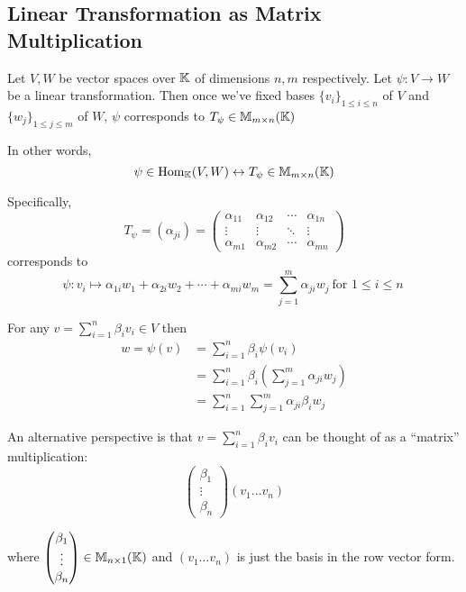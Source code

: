 \subsection{Linear Transformation as Matrix Multiplication}
\begin{claim}
    Let \(V, W\) be vector spaces over \(\mathbb{K}\) of dimensions \(n, m\) respectively. Let \(\psi: V \to W\) be a linear transformation. Then once we've fixed bases \(\{v_i\}_{1\leq i \leq n}\) of \(V\) and \(\{w_j\}_{1 \leq j \leq m}\) of \(W\), \(\psi\) corresponds to \(T_\psi \in \mathbb{M}_{m\times n}(\mathbb{K})\)

    In other words, \[
        \psi \in \mathrm{Hom}_{\mathbb{K}}(V, W) \leftrightarrow T_\psi \in \mathbb{M}_{m\times n}(\mathbb{K})
    \]
\end{claim}
Specifically,
\[
    T_\psi = (\alpha_{ji}) = \begin{pmatrix}
            \alpha_{11} & \alpha_{12} & \cdots & \alpha_{1n} \\
            \vdots      & \vdots      & \ddots & \vdots      \\
            \alpha_{m1} & \alpha_{m2} & \cdots & \alpha_{mn}
        \end{pmatrix}
\]
corresponds to \[
    \psi: v_i \mapsto \alpha_{1i}w_1 + \alpha_{2i}w_2 + \cdots + \alpha_{mi}w_m = \sum_{j=1}^{m}\alpha_{ji} w_j \:\text{for \(1 \leq i \leq n\)}\:
\]

For any \(v = \sum_{i = 1}^{n}\beta_i v_i \in V\) then \begin{align*}
    w = \psi(v) & = \sum_{i=1}^{n} \beta_i \psi(v_i)                                 \\
                & = \sum_{i=1}^{n} \beta_i \left(\sum_{j=1}^{m}\alpha_{ji}w_j\right) \\
                & = \sum_{i=1}^{n}\sum_{j=1}^{m}\alpha_{ji} \beta_i w_j
\end{align*}

An alternative perspective is that \(
v = \sum_{i=1}^{n} \beta_i v_i
\) can be thought of as a ``matrix'' multiplication: \[\begin{pmatrix}
            \beta_1 \\ \vdots \\ \beta_n
        \end{pmatrix} (v_1 \ldots v_n)\]

where \(\begin{pmatrix}
        \beta_1 \\ \vdots \\ \beta_n
    \end{pmatrix} \in \mathbb{M}_{n \times 1}(\mathbb{K})\) and \((v_1 \ldots v_n)\) is just the basis in the row vector form.

